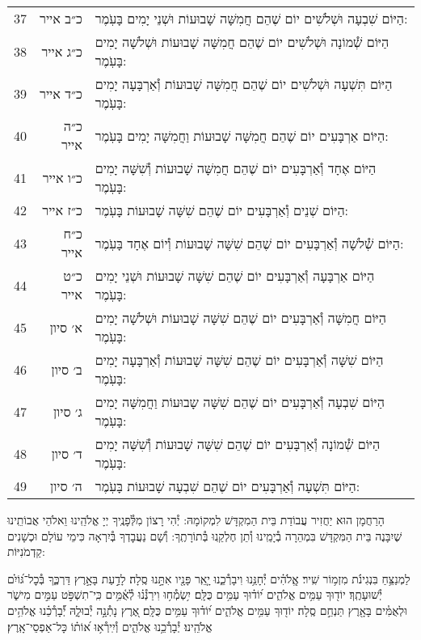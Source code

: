\documentclass[twoside, openany, parskip=half, 11pt]{book}
\begin{document}
\begin{scriptsize}
\begin{longtable}{ l | r | p{} }
37 & כ״ב אייר & הַיּוֹם שִׁבְעָה וּשְׁלֹשִׁים יוֹם שֶׁהֵם חֲמִשָּׁה שָׁבוּעוֹת וּשְׁנֵי יָמִים בָּעֹֽמֶר: \\
38 & כ״ג אייר & הַיּוֹם שְׁ֯מוֹנָה וּשְׁלֹשִׁים יוֹם שֶׁהֵם חֲמִשָּׁה שָׁבוּעוֹת וּשְׁלֹשָׁה יָמִים בָּעֹֽמֶר: \\
39 & כ״ד אייר & הַיּוֹם תִּשְׁעָה וּשְׁלֹשִׁים יוֹם שֶׁהֵם חֲמִשָּׁה שָׁבוּעוֹת וְ֯אַרְבָּעָה יָמִים בָּעֹֽמֶר: \\
40 & כ״ה אייר & הַיּוֹם אַרְבָּעִים יוֹם שֶׁהֵם חֲמִשָּׁה שָׁבוּעוֹת וַחֲמִשָּׁה יָמִים בָּעֹֽמֶר: \\
41 & כ״ו אייר & הַיּוֹם אֶחָד וְ֯אַרְבָּעִים יוֹם שֶׁהֵם חֲמִשָּׁה שָׁבוּעוֹת וְ֯שִׁשָּׁה יָמִים בָּעֹֽמֶר: \\
42 & כ״ז אייר & הַיּוֹם שְׁנֵים וְ֯אַרְבָּעִים יוֹם שֶׁהֵם שִׁשָּׁה שָׁבוּעוֹת בָּעֹֽמֶר: \\
43 & כ״ח אייר & הַיּוֹם שְׁ֯לֹשָׁה וְ֯אַרְבָּעִים יוֹם שֶׁהֵם שִׁשָּׁה שָׁבוּעוֹת וְ֯יוֹם אֶחָד בָּעֹֽמֶר: \\
44 & כ״ט אייר & הַיּוֹם אַרְבָּעָה וְ֯אַרְבָּעִים יוֹם שֶׁהֵם שִׁשָּׁה שָׁבוּעוֹת וּשְׁנֵי יָמִים בָּעֹֽמֶר: \\
45 & א׳ סיון & הַיּוֹם חֲמִשָּׁה וְ֯אַרְבָּעִים יוֹם שֶׁהֵם שִׁשָּׁה שָׁבוּעוֹת וּשְׁלֹשָׁה יָמִים בָּעֹֽמֶר: \\
46 & ב׳ סיון & הַיּוֹם שִׁשָּׁה וְ֯אַרְבָּעִים יוֹם שֶׁהֵם שִׁשָּׁה שָׁבוּעוֹת וְ֯אַרְבָּעָה יָמִים בָּעֹֽמֶר: \\
47 & ג׳ סיון & הַיּוֹם שִׁבְעָה וְ֯אַרְבָּעִים יוֹם שֶׁהֵם שִׁשָּׁה שָבוּעוֹת וַחֲמִשָּׁה יָמִים בָּעֹֽמֶר: \\
48 & ד׳ סיון & הַיּוֹם שְׁ֯מוֹנָה וְ֯אַרְבָּעִים יוֹם שֶׁהֵם שִׁשָּׁה שָׁבוּעוֹת וְ֯שִׁשָּׁה יָמִים בָּעֹֽמֶר: \\
49 & ה׳ סיון & הַיּוֹם תִּשְׁעָה וְ֯אַרְבָּעִים יוֹם שֶׁהֵם שִׁבְעָה שָׁבוּעוֹת בָּעֹֽמֶר:
\end{longtable}
\end{scriptsize}



הָרַחֲמָן הוּא יַחֲזִיר עֲבוֹדַת בֵּית הַמִקְדָּשׁ לִמְקוֹמָהּ:
יְ֯הִי רָצוֹן מִלְּ֯פָנֶֽיךָ יְיָ אֱלֹהֵֽינוּ וֵאלֹהֵי אֲבוֹתֵֽינוּ שֶׁיִבָּנֶה בֵּית הַמִּקְדָּשׁ בִּמְהֵרָה בְ֯יָמֵֽינוּ וְ֯תֵן חֶלְקֵֽנוּ בְּ֯תוֹרָתֶֽךָ: וְ֯שָׁם נַעֲבׇדְךָ בְּ֯יִרְאָה כִּימֵי עוֹלָם וּכְשָׁנִים קַדְמֹנִיּוֹת:


לַמְנַצֵּ֥חַ בִּנְגִינֹ֗ת מִזְמ֥וֹר שִֽׁיר׃ אֱֽלֹהִ֗ים יְ֯חָנֵּ֥נוּ וִיבָרְ֯כֵ֑נוּ יָ֤אֵֽר פָּנָ֖יו אִתָּ֣נוּ סֶֽלָה׃ לָדַ֣עַת בָּאָ֣רֶץ דַּרְכֶּ֑ךָ בְּ֯כׇל־גּ֝וֹיִ֗ם יְ֯שׁוּעָתֶֽךָ׃ יוֹד֖וּךָ עַמִּ֥ים אֱלֹהִ֑ים י֝וֹד֗וּךָ עַמִּ֥ים כֻּלָּֽם׃ יִ֥שְׂמְ֯ח֥וּ וִירַנְּ֯נ֗וּ לְ֯אֻ֫מִּ֥ים כִּֽי־תִשְׁפֹּ֣ט עַמִּ֣ים מִישֹׁ֑ר וּלְאֻמִּ֓ים בָּאָ֖רֶץ תַּנְחֵ֣ם סֶֽלָה׃ יוֹד֖וּךָ עַמִּ֥ים אֱלֹהִ֑ים י֝וֹד֗וּךָ עַמִּ֥ים כֻּלָּֽם׃ אֶ֭רֶץ נָתְ֯נָ֣ה יְ֯בוּלָ֑הּ יְ֯֝בָרְ֯כֵ֗נוּ אֱלֹהִ֥ים
אֱלֹהֵֽינוּ׃ יְ֯בָרְ֯כֵ֥נוּ אֱלֹהִ֑ים וְ֯יִֽירְ֯א֥וּ א֝וֹת֗וֹ כָּל־אַפְסֵי־אָֽרֶץ׃
\end{document}
